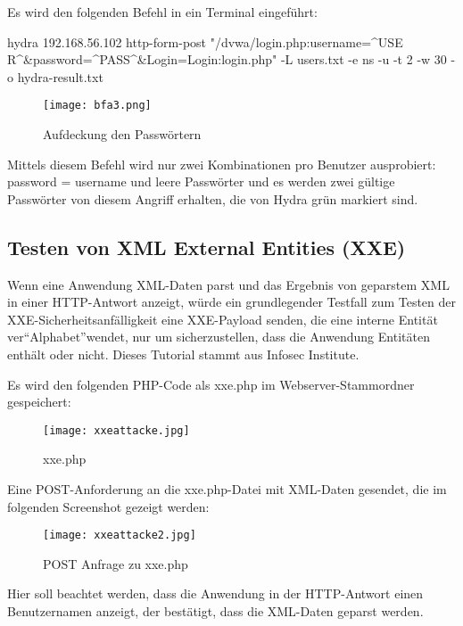 Es wird den folgenden Befehl in ein Terminal eingeführt\cite[145]{najera2016kali}:

\begin{LaTeXCode}[caption={Befehl durch Terminal},captionpos=b, label=LaTeXCode:beheldt1][numbers=none]
hydra 192.168.56.102 http-form-post "/dvwa/login.php:username=^USE
R^&password=^PASS^&Login=Login:login.php" -L users.txt -e ns -u -t 2 -w 30 -o hydra-result.txt
\end{LaTeXCode}

\begin{figure}[h]
	\centering
	\texttt{[image: bfa3.png]}
	\caption{Aufdeckung den Passwörtern}
\end{figure}

Mittels diesem Befehl wird nur zwei Kombinationen pro Benutzer ausprobiert: password = username und leere Passwörter und es werden zwei gültige Passwörter von diesem Angriff erhalten, die von Hydra grün markiert sind\cite[145]{najera2016kali}.

\subsection{Testen von XML External Entities (XXE)}

Wenn eine Anwendung XML-Daten parst und das Ergebnis von geparstem XML in einer HTTP-Antwort anzeigt, würde ein grundlegender Testfall zum Testen der XXE-Sicherheitsanfälligkeit eine XXE-Payload senden, die eine interne Entität ver"`Alphabet"'wendet, nur um sicherzustellen, dass die Anwendung Entitäten enthält oder nicht. Dieses Tutorial stammt aus Infosec Institute\cite{infosec18}.

Es wird den folgenden PHP-Code als xxe.php im Webserver-Stammordner gespeichert:

\newpage

\begin{figure}[h]
	\centering
	\texttt{[image: xxeattacke.jpg]}
	\caption{xxe.php}
\end{figure}

Eine POST-Anforderung an die xxe.php-Datei mit XML-Daten gesendet, die im folgenden Screenshot gezeigt werden:

\begin{figure}[h]
	\centering
	\texttt{[image: xxeattacke2.jpg]}
	\caption{POST Anfrage zu xxe.php}
\end{figure}

Hier soll beachtet werden, dass die Anwendung in der HTTP-Antwort einen Benutzernamen anzeigt, der bestätigt, dass die XML-Daten geparst werden.

